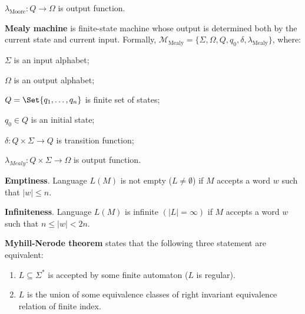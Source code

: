 \documentclass[a4paper,10pt]{article}
\begin{document}
\begin{terms}
\begin{terms}
        \item $\lambda_\text{Moore} \colon Q \to \Omega$ is output function.
    \end{terms}

    \item \textbf{Mealy machine} is finite-state machine whose output is determined both by the current state and current input.
    Formally, $\mathcal{M}_\text{Mealy} = \{\Sigma, \Omega, Q, q_0, \delta, \lambda_\text{Mealy}\}$, where:

    \begin{terms}
        \item $\Sigma$ is an input alphabet;

        \item $\Omega$ is an output alphabet;

        \item $Q = \Set{q_1, \dots, q_n}$ is finite set of states;

        \item $q_0 \in Q$ is an initial state;

        \item $\delta \colon Q \times \Sigma \to Q$ is transition function;

        \item $\lambda_{Mealy} \colon Q \times \Sigma \to \Omega$ is output function.
    \end{terms}

    \item \textbf{Emptiness}. Language $L(M)$ is not empty ($L \neq \emptyset$) if $M$ accepts a word $w$ such that $|w| \leq n$.

    \item \textbf{Infiniteness}. Language $L(M)$ is infinite $(|L| = \infty)$ if $M$ accepts a word $w$ such that $n \leq |w| < 2n$.

    \item \textbf{Myhill-Nerode theorem} states that the following three statement are equivalent:
    \begin{enumerate}
        \item $L \subseteq \Sigma^*$ is accepted by some finite automaton ($L$ is regular).

        \item $L$ is the union of some equivalence classes of right invariant equivalence relation of finite index.


\end{enumerate}
\end{terms}
\end{document}
